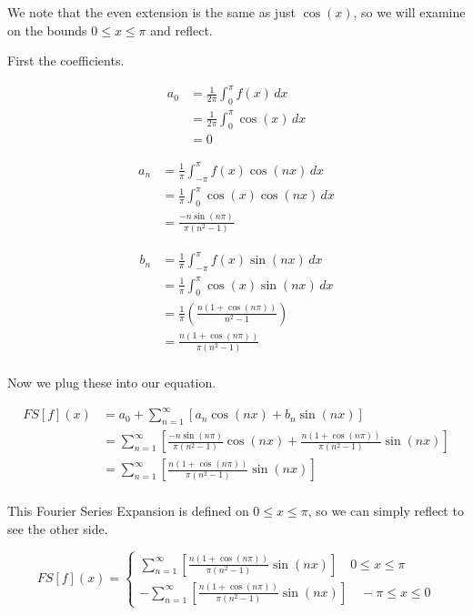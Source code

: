 \documentclass[10pt]{article}
\begin{document}
\begin{easylist}[enumerate]
    We note that the even extension is the same as just $\cos(x)$, so we will examine on the bounds $0 \le x \le \pi$
    and reflect.

    First the coefficients.

    \begin{align*}
        a_0 &= \frac{1}{2\pi} \int_{0}^\pi f(x) \, dx\\
            &= \frac{1}{2\pi} \int_{0}^\pi \cos(x) \, dx \\
            &= 0
    \end{align*}

    \begin{align*}
        a_n &= \frac{1}{\pi} \int_{-\pi}^\pi f(x) \cos(nx) \, dx\\
            &= \frac{1}{\pi} \int_0^\pi \cos(x) \cos(nx) \, dx \\
            &= \frac{-n \sin(n \pi)}{\pi (n^2 - 1)}
    \end{align*}

    \begin{align*}
        b_n &= \frac{1}{\pi} \int_{-\pi}^\pi f(x) \sin(nx) \, dx\\
            &= \frac{1}{\pi} \int_0^\pi \cos(x) \sin(nx) \, dx \\
            &= \frac{1}{\pi} \left( \frac{n(1 + \cos(n \pi))}{n^2 - 1} \right)\\
            &= \frac{n(1 + \cos(n \pi))}{\pi(n^2 - 1)}\\
    \end{align*}

    Now we plug these into our equation.

    \begin{align*}
        FS[f](x) &= a_0 + \sum_{n=1}^\infty \left[ a_n \cos(nx) + b_n \sin(nx) \right]\\
                &= \sum_{n=1}^\infty \left[ \frac{-n \sin(n \pi)}{\pi (n^2 - 1)} \cos(nx) +
                    \frac{n(1 + \cos(n \pi))}{\pi(n^2 - 1)} \sin(nx) \right]\\
                &= \sum_{n=1}^\infty \left[ \frac{n(1 + \cos(n \pi))}{\pi(n^2 - 1)} \sin(nx) \right]\\
    \end{align*}

    This Fourier Series Expansion is defined on $0 \le x \le \pi$, so we can simply reflect to see the other side.

    \[
        FS[f](x) = \begin{cases}
            \sum_{n=1}^\infty \left[ \frac{n(1 + \cos(n \pi))}{\pi(n^2 - 1)} \sin(nx) \right]
                \quad 0 \le x \le \pi\\
            -\sum_{n=1}^\infty \left[ \frac{n(1 + \cos(n \pi))}{\pi(n^2 - 1)} \sin(nx) \right]
                \quad -\pi \le x \le 0
        \end{cases}
    \]


\end{easylist}
\end{document}
